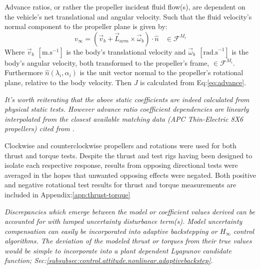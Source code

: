 Advance ratios, or rather the propeller incident fluid flow(s), are dependent on the vehicle's net translational and angular velocity. Such that the fluid velocity's normal component to the propeller plane is given by:
\begin{equation}\label{eq:normal-fluid}
v_\infty = (\vec{v}_b + \vec{L}_{arm}\times \vec{\omega}_b)\cdot \hat{n}~~~~\in\mathcal{F}^{M_i}
\end{equation}
Where $\vec{v}_b~~[\text{m.s}^{-1}]$ is the body's translational velocity and $\vec{\omega}_b~~[\text{rad.s}^{-1}]$ is the body's angular velocity, both transformed to the propeller's frame, $\in\mathcal{F}^{M_i}$. Furthermore $\hat{n}(\lambda_i,\alpha_i)$ is the unit vector normal to the propeller's rotational plane, relative to the body velocity. Then $J$ is calculated from Eq:\ref{eq:advance}.
\par
{\color{Gray}\emph{It's worth reiterating that the above static coefficients are indeed calculated from physical static tests. However advance ratio coefficient dependencies are linearly interpolated from the closest available matching data (APC Thin-Electric 8X6 propellers) cited from \cite{UIUC}}.}
\par
Clockwise and counterclockwise propellers and rotations were used for both thrust and torque tests. Despite the thrust and test rigs having been designed to isolate each respective response, results from opposing directional tests were averaged in the hopes that unwanted opposing effects were negated. Both positive and negative rotational test results for thrust and torque measurements are included in Appendix:\ref{app:thrust-torque}
\par
{\color{Gray}\emph{Discrepancies which emerge between the model or coefficient values derived can be accounted for with lumped uncertainty disturbance term(s). Model uncertainty compensation can easily be incorporated into adaptive backstepping or $H_\infty$ control algorithms. The deviation of the modeled thrust or torques from their true values would be simple to incorporate into a plant dependent Lyapunov candidate function; Sec:\ref{subsubsec:control.attitude.nonlinear.adaptivebackstep}.}}
